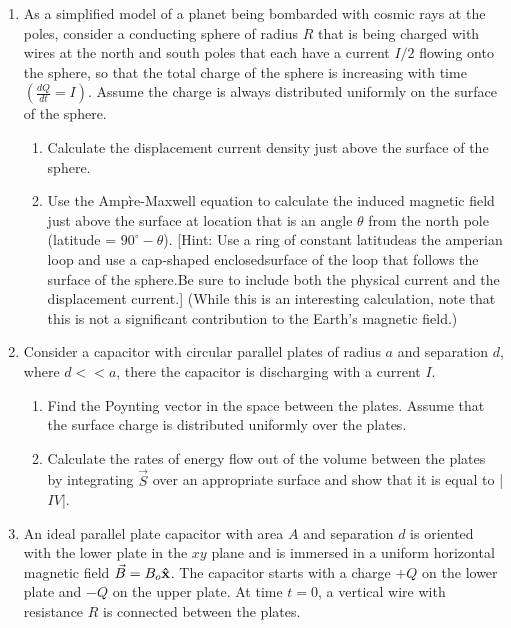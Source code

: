 \begin{enumerate}

  \item As a simplified model of a planet being bombarded with cosmic rays at the poles, consider a conducting sphere of radius $R$ that is being charged with wires at the north and south poles that each have a current $I/2$ flowing onto the sphere, so that the total charge of the sphere is increasing with time $\left( \frac{dQ}{dt}=I \right)$.  Assume the charge is always distributed uniformly on the surface of the sphere.

    \begin{enumerate}

      \item Calculate the displacement current density just above the surface of the sphere.

      \item Use the Amp\`re-Maxwell equation to calculate the induced magnetic field just above the surface at location that is an angle $\theta$ from the north pole (latitude = $90^{\circ}-\theta$). [Hint: Use a ring of constant latitudeas the amperian loop and use a cap-shaped enclosedsurface of the loop that follows the surface of the sphere.Be sure to include both the physical current and the displacement current.]  (While this is an interesting calculation, note that this is not a significant contribution to the Earth’s magnetic field.)

    \end{enumerate}

  \item Consider a capacitor with circular parallel plates of radius $a$ and separation $d$, where $d<<a$, there the capacitor is discharging with a current $I$.

    \begin{enumerate}

      \item Find the Poynting vector in the space between the plates. Assume that the surface charge is distributed uniformly over the plates.

      \item Calculate the rates of energy flow out of the volume between the plates by integrating $\vec{S}$ over an appropriate surface and show that it is equal to |$IV$|.

    \end{enumerate}

  \item An ideal parallel plate capacitor with area $A$ and separation $d$ is oriented with the lower plate in the $xy$ plane and is immersed in a uniform horizontal magnetic field $\vec{B}=B_o\bold{\hat{x}}$. The capacitor starts with a charge $+Q$ on the lower plate and $−Q$ on the upper plate. At time $t=0$, a vertical wire with resistance $R$ is connected between the plates.


\end{enumerate}
